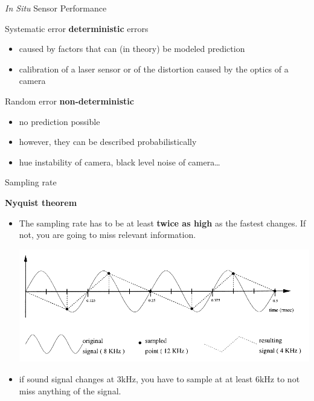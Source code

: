 \documentclass[compress]{beamer}
\begin{document}
\begin{frame}{\emph{In Situ} Sensor Performance}


Systematic error \Rightarrow \textbf{deterministic} errors

\begin{itemize}
\item
  caused by factors that can (in theory) be modeled \rightarrow
  prediction
\item
  \eg calibration of a laser sensor or of the distortion caused by the
  optics of a camera
\end{itemize}

Random error \Rightarrow \textbf{non-deterministic}

\begin{itemize}

\item
  no prediction possible
\item
  however, they can be described probabilistically
\item
  \eg hue instability of camera, black level noise of camera\ldots
\end{itemize}

\end{frame}

\begin{frame}{Sampling rate}

\textbf{Nyquist theorem}

\begin{itemize}

    \item The sampling rate has to be at least \textbf{twice as high} as the
        fastest changes. If not, you are going to miss relevant information.
        \begin{center}
            \includegraphics[width=0.8\linewidth]{nyquist}
        \end{center}

    \item \eg if sound signal changes at 3kHz, you have to sample at at least
        6kHz to not miss anything of the signal.
\end{itemize}

\end{frame}
\end{document}
